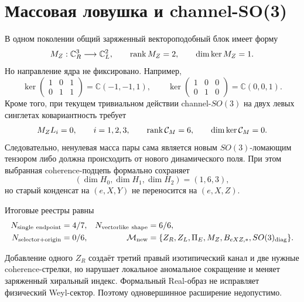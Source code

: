 \section{Массовая ловушка и channel-SO(3)}

В одном поколении общий заряженный вектороподобный блок имеет форму
\begin{equation}
 M_Z:\mathbb C^3_R\longrightarrow\mathbb C^2_L,
 \qquad
 \operatorname{rank} M_Z=2,
 \qquad
 \dim\ker M_Z=1.
 \label{eq:v8-isotypic-extension-mass-kernel}
\end{equation}
Но направление ядра не фиксировано. Например,
\begin{equation}
 \ker\begin{pmatrix}1&0&1\\0&1&1\end{pmatrix}
 =\mathbb C(-1,-1,1),
 \qquad
 \ker\begin{pmatrix}1&0&0\\0&1&0\end{pmatrix}
 =\mathbb C(0,0,1).
 \label{eq:v8-isotypic-extension-two-kernels}
\end{equation}
Кроме того, при текущем тривиальном действии channel-$SO(3)$ на двух левых
синглетах ковариантность требует
\begin{equation}
 M_ZL_i=0,
 \qquad i=1,2,3,
 \qquad
 \operatorname{rank}\mathcal C_M=6,
 \qquad
 \dim\ker\mathcal C_M=0.
 \label{eq:v8-isotypic-extension-so3-mass-no-go}
\end{equation}
Следовательно, ненулевая масса пары сама является новым
$SO(3)$-ломающим тензором либо должна происходить от нового динамического
поля. При этом выбранная coherence-подцепь формально сохраняет
\begin{equation}
 (\dim H_0,\dim H_1,\dim H_2)=(1,6,3),
 \label{eq:v8-isotypic-extension-chain-dimensions}
\end{equation}
но старый конденсат на $(e,X,Y)$ не переносится на $(e,X,Z)$.

Итоговые реестры равны
\begin{equation}
 \begin{aligned}
 N_{\rm single\ endpoint}&=4/7,
 &N_{\rm vectorlike\ shape}&=6/6,\\
 N_{\rm selector+origin}&=0/6,
 &\mathcal M_{\rm new}&=\{Z_R,Z_L,\Pi_E,M_Z,B_{eXZ,*},SO(3)_{\rm diag}\}.
 \end{aligned}
 \label{eq:v8-isotypic-extension-ledgers}
\end{equation}

\begin{theorem}
Добавление одного $Z_R$ создаёт третий правый изотипический канал и две
нужные coherence-стрелки, но нарушает локальное аномальное сокращение и
меняет заряженный хиральный индекс. Формальный Real-образ не исправляет
физический Weyl-сектор. Поэтому одновершинное расширение недопустимо.
\end{theorem}

